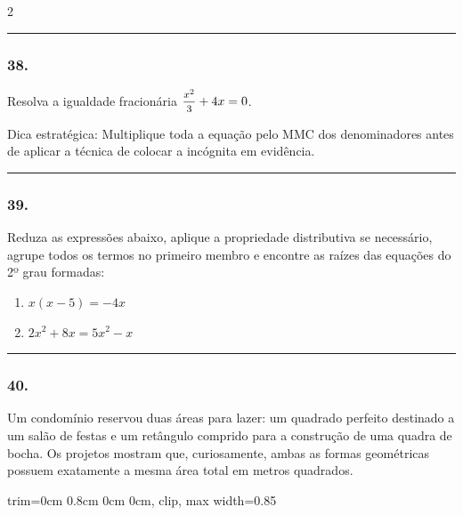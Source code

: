 \documentclass[twoside, 10pt, a4paper]{article}
\newlength{\espacoPreQuestao}\setlength{\espacoPreQuestao}{0.1cm}
\newlength{\espacoQuestao}\setlength{\espacoQuestao}{0.2cm}
\newcommand{\larguraTikz}{0.85\linewidth}
\begin{document}
\begin{multicols*}{2}
\noindent\textcolor{CorLinha}{\rule{\linewidth}{0.5pt}} 
\par\vspace{\espacoPreQuestao}
\subsubsection*{38.} Resolva a igualdade fracionária $ \mfrac{x^2}{3} + 4x = 0 $. 
\begin{boxdica}
Dica estratégica: Multiplique toda a equação pelo MMC dos denominadores antes de aplicar a técnica de colocar a incógnita em evidência.
\end{boxdica}
\par\vspace{\espacoQuestao}

\noindent\textcolor{CorLinha}{\rule{\linewidth}{0.5pt}} 
\par\vspace{\espacoPreQuestao}
\subsubsection*{39.} Reduza as expressões abaixo, aplique a propriedade distributiva se necessário, agrupe todos os termos no primeiro membro e encontre as raízes das equações do 2º grau formadas:
\begin{enumerate}[label=\Alph*)]
    \item $ x(x - 5) = -4x $
    \item $ 2x^2 + 8x = 5x^2 - x $
\end{enumerate}
\par\vspace{\espacoQuestao}

\noindent\textcolor{CorLinha}{\rule{\linewidth}{0.5pt}} 
\par\vspace{\espacoPreQuestao}
\subsubsection*{40.} Um condomínio reservou duas áreas para lazer: um quadrado perfeito destinado a um salão de festas e um retângulo comprido para a construção de uma quadra de bocha. Os projetos mostram que, curiosamente, ambas as formas geométricas possuem exatamente a mesma área total em metros quadrados.

\begin{center}
\begin{adjustbox}{trim=0cm 0.8cm 0cm 0cm, clip, max width=\larguraTikz}
\end{adjustbox}
\end{center}
\end{multicols*}
\end{document}
